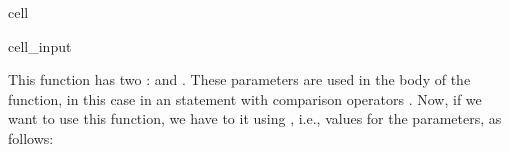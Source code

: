 \documentclass[letterpaper,10pt,english]{jupyterBook}
\begin{document}
\begin{sphinxuseclass}{cell}\begin{sphinxVerbatimInput}

\begin{sphinxuseclass}{cell_input}
\begin{sphinxVerbatim}[commandchars=\\\{\}]
     
       
       
\end{sphinxVerbatim}

\end{sphinxuseclass}\end{sphinxVerbatimInput}

\end{sphinxuseclass}
\sphinxAtStartPar
This function has two :  and . These parameters are used in the body of the function, in this case in an \sphinxhyphen{}statement with comparison operators \sphinxcode{\sphinxupquote{<}}. Now, if we want to use this function, we have to  it using , i.e., values for the parameters, as follows:
\end{document}
